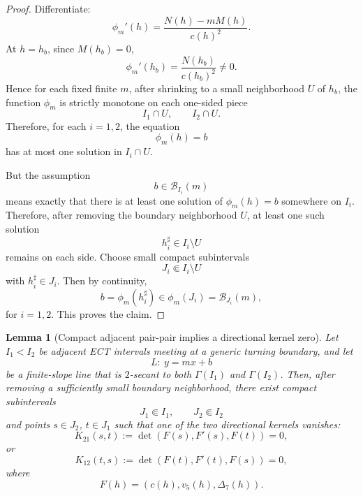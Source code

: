 \documentclass[11pt,a4paper]{amsart}
\theoremstyle{plain}
\newtheorem{lemma}[theorem]{Lemma}
\theoremstyle{definition}
\begin{document}
\begin{proof}
Differentiate:
\[
\phi_m'(h)=\frac{N(h)-mM(h)}{c(h)^2}.
\]
At $h=h_b$, since $M(h_b)=0$,
\[
\phi_m'(h_b)=\frac{N(h_b)}{c(h_b)^2}\neq 0.
\]
Hence for each fixed finite $m$, after shrinking to a small neighborhood $U$
of $h_b$, the function $\phi_m$ is strictly monotone on each one-sided piece
\[
I_1\cap U,
\qquad
I_2\cap U.
\]
Therefore, for each $i=1,2$, the equation
\[
\phi_m(h)=b
\]
has at most one solution in $I_i\cap U$.

But the assumption
\[
b\in \mathcal B_{I_i}(m)
\]
means exactly that there is at least one solution of $\phi_m(h)=b$ somewhere
on $I_i$. Therefore, after removing the boundary neighborhood $U$, at least
one such solution
\[
h_i^\sharp\in I_i\setminus U
\]
remains on each side. Choose small compact subintervals
\[
J_i\Subset I_i\setminus U
\]
with $h_i^\sharp\in J_i$. Then by continuity,
\[
b=\phi_m(h_i^\sharp)\in \phi_m(J_i)=\mathcal B_{J_i}(m),
\]
for $i=1,2$. This proves the claim.
\end{proof}

\begin{lemma}[Compact adjacent pair-pair implies a directional kernel zero]
\label{lem:pair-pair-gives-directional-kernel-zero}
Let $I_1<I_2$ be adjacent ECT intervals meeting at a generic turning boundary,
and let
\[
L:\ y=mx+b
\]
be a finite-slope line that is $2$-secant to both $\Gamma(I_1)$ and
$\Gamma(I_2)$.
Then, after removing a sufficiently small boundary neighborhood, there exist
compact subintervals
\[
J_1\Subset I_1,
\qquad
J_2\Subset I_2
\]
and points $s\in J_2$, $t\in J_1$ such that one of the two directional
kernels vanishes:
\[
K_{21}(s,t):=\det(F(s),F'(s),F(t))=0,
\]
or
\[
K_{12}(t,s):=\det(F(t),F'(t),F(s))=0,
\]
where
\[
F(h)=(c(h),v_5(h),\Delta_7(h)).
\]
\end{lemma}
\end{document}
